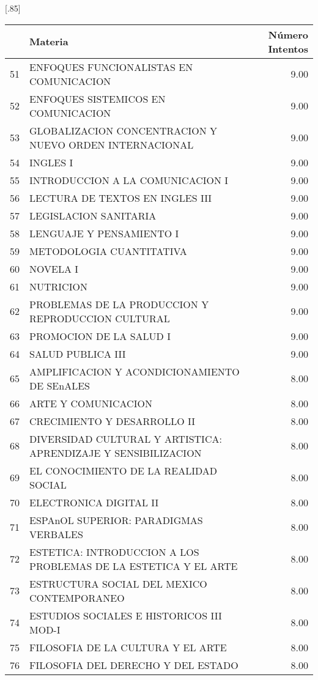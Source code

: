 \documentclass[12pt]{article}
\begin{document}
\begin{table}[ht]
\centering
\scalebox{0.75}[.85]{
\begin{tabular}{rlr}
  \hline
 & Materia & N\'umero Intentos  \\ 
  \hline
  51 & ENFOQUES FUNCIONALISTAS EN COMUNICACION & 9.00 \\ 
  52 & ENFOQUES SISTEMICOS EN COMUNICACION & 9.00 \\ 
  53 & GLOBALIZACION CONCENTRACION Y NUEVO ORDEN INTERNACIONAL & 9.00 \\ 
   54 & INGLES I & 9.00 \\ 
  55 & INTRODUCCION A LA COMUNICACION I & 9.00 \\ 
  56 & LECTURA DE TEXTOS EN INGLES III & 9.00 \\ 
  57 & LEGISLACION SANITARIA & 9.00 \\ 
  58 & LENGUAJE Y PENSAMIENTO I & 9.00 \\ 
  59 & METODOLOGIA CUANTITATIVA & 9.00 \\ 
  60 & NOVELA I & 9.00 \\ 
  61 & NUTRICION & 9.00 \\ 
  62 & PROBLEMAS DE LA PRODUCCION Y REPRODUCCION CULTURAL & 9.00 \\ 
  63 & PROMOCION DE LA SALUD I & 9.00 \\ 
  64 & SALUD PUBLICA III & 9.00 \\ 
  65 & AMPLIFICACION Y ACONDICIONAMIENTO DE SEnALES & 8.00 \\ 
  66 & ARTE Y COMUNICACION & 8.00 \\ 
  67 & CRECIMIENTO Y DESARROLLO II & 8.00 \\ 
  68 & DIVERSIDAD CULTURAL Y ARTISTICA: APRENDIZAJE Y SENSIBILIZACION & 8.00 \\ 
  69 & EL CONOCIMIENTO DE LA REALIDAD SOCIAL & 8.00 \\ 
  70 & ELECTRONICA DIGITAL II & 8.00 \\ 
  71 & ESPAnOL SUPERIOR: PARADIGMAS VERBALES & 8.00 \\ 
  72 & ESTETICA: INTRODUCCION A LOS PROBLEMAS DE LA ESTETICA Y EL ARTE & 8.00 \\ 
  73 & ESTRUCTURA SOCIAL DEL MEXICO CONTEMPORANEO & 8.00 \\ 
  74 & ESTUDIOS SOCIALES E HISTORICOS III MOD-I & 8.00 \\ 
  75 & FILOSOFIA DE LA CULTURA Y EL ARTE & 8.00 \\ 
  76 & FILOSOFIA DEL DERECHO Y DEL ESTADO & 8.00 \\ 

\end{tabular}}
\end{table}
\end{document}
